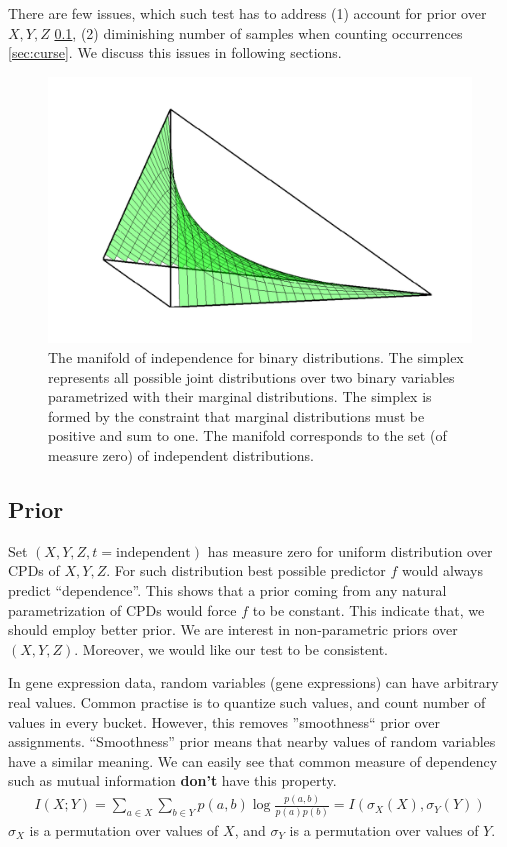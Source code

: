 \documentclass{article} %
\begin{document}
There are few issues, which such test has to address 
(1) account for prior over $X, Y, Z$ \ref{sec:prior}, (2) diminishing number of samples when
counting occurrences \ref{sec:curse}. We discuss this issues
in following sections. 


\begin{figure}[h]
\centering
\includegraphics[width=0.35\linewidth]{img/independence_surface-eps-converted-to-crop.pdf}
\caption{The manifold of independence for binary distributions. The simplex represents all possible joint distributions over two binary variables parametrized with their marginal distributions. The simplex is formed by the constraint that marginal distributions must be positive and sum to one.  The manifold corresponds to the set (of measure zero) of independent distributions.}
\label{fig:ind}
\end{figure}

\subsection{Prior}\label{sec:prior}
Set $(X, Y, Z, t=\text{independent})$ has measure zero for uniform
distribution over CPDs of $X, Y, Z$. For such distribution
best possible predictor $f$ would always predict ``dependence''. 
This shows that a prior coming from any natural parametrization
of CPDs would force $f$ to be constant. This indicate that, we should
employ better prior. We are interest in non-parametric priors over $(X, Y, Z)$.
Moreover, we would like our test to be consistent.


In gene expression data, random variables (gene expressions) can 
have arbitrary real values. Common practise is to quantize such values,
and count number of values in every bucket. However, this removes 
''smoothness`` prior over assignments. ``Smoothness'' prior means that
nearby values of random variables have a similar meaning. We can easily see
that common measure of dependency such as mutual information {\bf don't} have 
this property. 
\begin{align*}
  I(X;Y)=\sum_{a \in X}\sum_{b \in Y} p(a, b)\log{\frac{p(a, b)}{p(a)p(b)}}=I(\sigma_X(X), \sigma_Y(Y))
\end{align*}
$\sigma_X$ is a permutation over values of $X$, and $\sigma_Y$ is
a permutation over values of $Y$.
\end{document}
